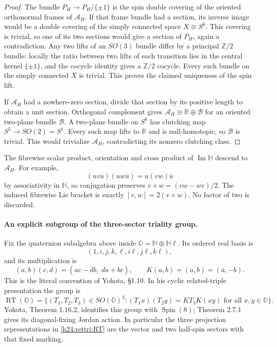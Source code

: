\begin{proof}
The bundle $P_H\to P_H/\{\pm1\}$ is the spin double covering of
the oriented orthonormal frames of $\mathcal A_H$. If that frame
bundle had a section, its inverse image would be a double covering
of the simply connected space $X\cong S^6$. This covering is
trivial, so one of its two sections would give a section of $P_H$,
again a contradiction. Any two lifts of an $SO(3)$ bundle differ
by a principal $\mathbb Z/2$ bundle: locally the ratio between two
lifts of each transition lies in the central kernel $\{\pm1\}$,
and the cocycle identity gives a $\mathbb Z/2$ cocycle. Every such
bundle on the simply connected $X$ is trivial. This proves the
claimed uniqueness of the spin lift.

If $\mathcal A_H$ had a nowhere-zero section, divide that section
by its positive length to obtain a unit section. Orthogonal
complement gives $\mathcal A_H\cong\mathbb R\oplus\mathcal B$
for an oriented two-plane bundle $\mathcal B$. A two-plane
bundle on $S^6$ has clutching map $S^5\to SO(2)=S^1$.
Every such map lifts to $\mathbb R$ and is null-homotopic, so
$\mathcal B$ is trivial. This would trivialize $\mathcal A_H$,
contradicting its nonzero clutching class.
\end{proof}

The fibrewise scalar product, orientation and cross product of
$\operatorname{Im}\mathbb H$ descend to $\mathcal A_H$.
For example,
\[
 (uv\overline u)(uw\overline u)=u(vw)\overline u
\]
by associativity in $\mathbb H$, so conjugation preserves
$v\times w=(vw-wv)/2$. The induced fibrewise Lie bracket is
exactly $[v,w]=2(v\times w)$. No factor of two is discarded.

\paragraph{An explicit subgroup of the three-sector triality group.}
Fix the quaternion subalgebra above inside
$\mathbb O=\mathbb H\oplus\mathbb H\ell$. Its ordered real basis is
\[
 (1,i,j,k,\ell,i\ell,j\ell,k\ell),
\]
and its multiplication is
\begin{equation}
 (a,b)(c,d)=(ac-\overline d b,\;da+b\overline c),\qquad
 K(a,b)=\overline{(a,b)}=(\overline a,-b).
 \label{h24:rettri:CD}
\end{equation}
This is the literal convention of Yokota, \S1.10. In his cyclic
related-triple presentation the group is
\begin{equation}
 \operatorname{RT}(\mathbb O)=
 \{(T_1,T_2,T_3)\in SO(\mathbb O)^3:
       (T_1x)(T_2y)=K T_3 K(xy)\text{ for all }x,y\in\mathbb O\}.
 \label{h24:rettri:RT}
\end{equation}
Yokota, Theorem 1.16.2, identifies this group with
$\operatorname{Spin}(8)$; Theorem 2.7.1 \cite{h24:Yokota2009} gives its diagonal-fixing
Jordan action. In particular the three projection representations
in \eqref{h24:rettri:RT} are the vector and two half-spin sectors
with that fixed marking.

